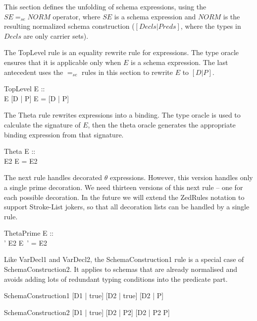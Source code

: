 \documentclass{entcs}
\newcommand{\sexprUnfoldsTo}{\mathrel{=_{se}}}
\newcommand{\declListUnfoldsTo}{\mathrel{=_d}}
\newcommand{\is}{\mathrel{is}}
\begin{document}
This section defines the unfolding of schema expressions,
using the $SE \sexprUnfoldsTo NORM$ operator, where $SE$
is a schema expression and $NORM$ is the resulting normalized
schema construction ($[Decls|Preds]$, where the types in $Decls$
are only carrier sets).

The TopLevel rule is an equality rewrite rule for expressions.  The
type oracle ensures that it is applicable only when $E$ is a schema
expression.  The last antecedent uses the $\sexprUnfoldsTo$ rules in
this section to rewrite $E$ to $[D | P]$.

\begin{zedrule}{TopLevel}
  E :: \power [D2 | true] \\
  E  \sexprUnfoldsTo [D | P]
\derives
  E = [D | P]
\end{zedrule}

The Theta rule rewrites expressions into a binding.  The type
oracle is used to calculate the signature of $E$, then the theta
oracle generates the appropriate binding expression from that
signature.
\begin{zedrule}{Theta}
  E :: \power [D | true] \\
  \theta [D | true] \is E2
\derives
  \theta E = E2
\end{zedrule}


The next rule handles decorated $\theta$ expressions.  However, this
version handles only a single prime decoration.  We need thirteen
versions of this next rule -- one for 
each possible decoration.   In the future we will extend the ZedRules
notation to support Stroke-List jokers, so that all decoration lists can
be handled by a single rule.

\begin{zedrule}{ThetaPrime}
  E :: \power [D | true] \\
  \theta [D | true] ' \is E2
\derives
  \theta E~' = E2
\end{zedrule}

Like VarDecl1 and VarDecl2, the SchemaConstruction1 rule is a special
case of SchemaConstruction2.  It applies to schemas that are already
normalised and avoids adding lots of redundant typing conditions into
the predicate part.
\begin{zedrule}{SchemaConstruction1}
  [D1 | true] \declListUnfoldsTo [D2 | true]
\derives
  [D1 | P] \sexprUnfoldsTo [D2 | P]
\end{zedrule}

\begin{zedrule}{SchemaConstruction2}
  [D1 | true] \declListUnfoldsTo [D2 | P2]
\derives
  [D1 | P] \sexprUnfoldsTo [D2 | P2 \land P]
\end{zedrule}
\end{document}
